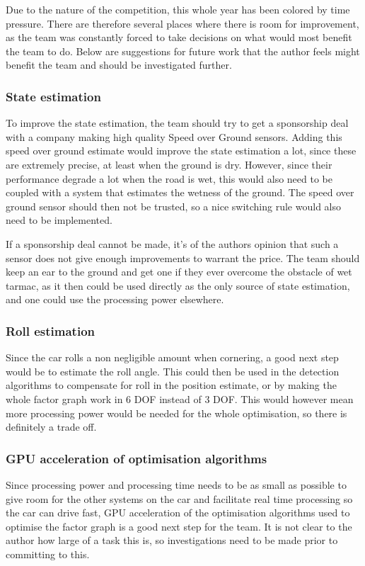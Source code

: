 Due to the nature of the competition, this whole year has been colored by time pressure. There are therefore several places where there is room for improvement, as the team was constantly forced to take decisions on what would most benefit the team to do. Below are suggestions for future work that the author feels might benefit the team and should be investigated further.

\subsubsection{State estimation}
To improve the state estimation, the team should try to get a sponsorship deal with a company making high quality Speed over Ground sensors. Adding this speed over ground estimate would improve the state estimation a lot, since these are extremely precise, at least when the ground is dry. However, since their performance degrade a lot when the road is wet, this would also need to be coupled with a system that estimates the wetness of the ground. The speed over ground sensor should then not be trusted, so a nice switching rule would also need to be implemented. 

If a sponsorship deal cannot be made, it's of the authors opinion that such a sensor does not give enough improvements to warrant the price. The team should keep an ear to the ground and get one if they ever overcome the obstacle of wet tarmac, as it then could be used directly as the only source of state estimation, and one could use the processing power elsewhere.

\subsubsection{Roll estimation}
Since the car rolls a non negligible amount when cornering, a good next step would be to estimate the roll angle. This could then be used in the detection algorithms to compensate for roll in the position estimate, or by making the whole factor graph work in 6 \gls{DOF} instead of 3 \gls{DOF}. This would however mean more processing power would be needed for the whole optimisation, so there is definitely a trade off.

\subsubsection{GPU acceleration of optimisation algorithms}
Since processing power and processing time needs to be as small as possible to give room for the other systems on the car and facilitate real time processing so the car can drive fast, GPU acceleration of the optimisation algorithms used to optimise the factor graph is a good next step for the team. It is not clear to the author how large of a task this is, so investigations need to be made prior to committing to this.

